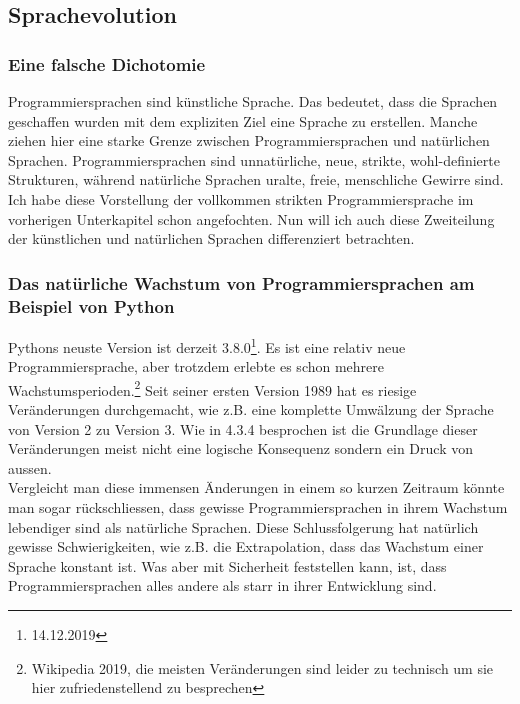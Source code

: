 \documentclass[10pt,a4paper]{article}
\begin{document}
\subsection{Sprachevolution}

\subsubsection{Eine falsche Dichotomie}
Programmiersprachen sind künstliche Sprache. Das bedeutet, dass die Sprachen geschaffen wurden mit dem expliziten Ziel eine Sprache zu erstellen. Manche ziehen hier eine starke Grenze zwischen Programmiersprachen und natürlichen Sprachen. Programmiersprachen sind unnatürliche, neue, strikte, wohl-definierte Strukturen, während natürliche Sprachen uralte, freie, menschliche Gewirre sind.
Ich habe diese Vorstellung der vollkommen strikten Programmiersprache im vorherigen Unterkapitel schon angefochten. Nun will ich auch diese Zweiteilung der künstlichen und natürlichen Sprachen differenziert betrachten.

\subsubsection{Das natürliche Wachstum von Programmiersprachen am Beispiel von Python}
Pythons neuste Version ist derzeit 3.8.0\footnote{14.12.2019}. Es ist eine relativ neue Programmiersprache, aber trotzdem erlebte es schon mehrere Wachstumsperioden.\footnote{Wikipedia 2019, die meisten Veränderungen sind leider zu technisch um sie hier zufriedenstellend zu besprechen} Seit seiner ersten Version 1989 hat es riesige Veränderungen durchgemacht, wie z.B. eine komplette Umwälzung der Sprache von Version 2 zu Version 3. Wie in 4.3.4 besprochen ist die Grundlage dieser Veränderungen meist nicht eine logische Konsequenz sondern ein Druck von aussen. \\
Vergleicht man diese immensen Änderungen in einem so kurzen Zeitraum könnte man sogar rückschliessen, dass gewisse Programmiersprachen in ihrem Wachstum lebendiger sind als natürliche Sprachen. Diese Schlussfolgerung hat natürlich gewisse Schwierigkeiten, wie z.B. die Extrapolation, dass das Wachstum einer Sprache konstant ist. Was aber mit Sicherheit feststellen kann, ist, dass Programmiersprachen alles andere als starr in ihrer Entwicklung sind.
\end{document}
